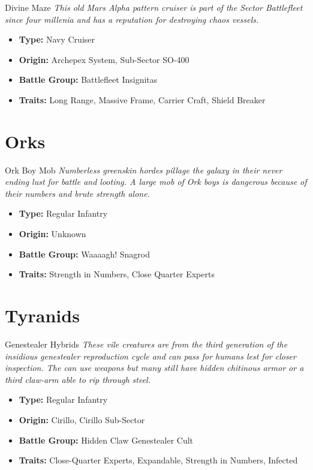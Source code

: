 \begin{DndSidebar}{Divine Maze}
\textit{This old Mars Alpha pattern cruiser is part of the Sector Battlefleet since four millenia and has a reputation for destroying chaos vessels.}
\begin{itemize}
	\item \textbf{Type:} Navy Cruiser
	\item \textbf{Origin:} Archepex System, Sub-Sector SO-400
	\item \textbf{Battle Group:} Battlefleet Insignitas
	\item \textbf{Traits:} Long Range, Massive Frame, Carrier Craft, Shield Breaker
\end{itemize}
\end{DndSidebar}

\section{Orks}
\begin{DndSidebar}{Ork Boy Mob}
\textit{Numberless greenskin hordes pillage the galaxy in their never ending lust for battle and looting. A large mob of Ork boys is dangerous because of their numbers and brute strength alone.}
\begin{itemize}
	\item \textbf{Type:} Regular Infantry
	\item \textbf{Origin:} Unknown
	\item \textbf{Battle Group:} Waaaagh! Snagrod
	\item \textbf{Traits:} Strength in Numbers, Close Quarter Experts
\end{itemize}
\end{DndSidebar}

\section{Tyranids}
\begin{DndSidebar}{Genestealer Hybrids}
\textit{These vile creatures are from the third generation of the insidious genestealer reproduction cycle and can pass for humans lest for closer inspection. The can use weapons but many still have hidden chitinous armor or a third claw-arm able to rip through steel.}
\begin{itemize}
	\item \textbf{Type:} Regular Infantry
	\item \textbf{Origin:} Cirillo, Cirillo Sub-Sector
	\item \textbf{Battle Group:} Hidden Claw Genestealer Cult
	\item \textbf{Traits:} Close-Quarter Experts, Expandable, Strength in Numbers, Infected
\end{itemize}
\end{DndSidebar}

